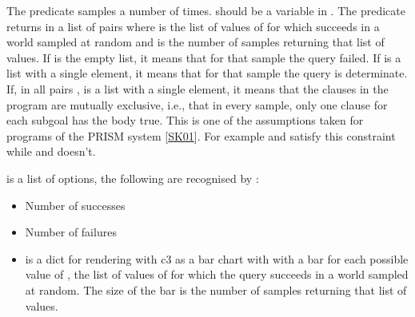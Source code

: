\documentclass[letterpaper,10pt,english]{sphinxmanual}
\begin{document}
\sphinxAtStartPar
The predicate samples  a number of  times.  should be a variable in .
The predicate returns in  a list of pairs  where  is the list of values of  for which  succeeds in a world sampled at random and  is the number of samples returning that list of values. If  is the empty list, it means that for that sample the query failed.
If  is a list with a single element, it means that for that sample the query is determinate.
If, in all pairs ,  is a list with a single element, it means that the clauses in the program are mutually exclusive, i.e., that in every sample, only one clause for each subgoal has the body true.
This is one of the assumptions taken for programs of the PRISM system {[}\hyperlink{cite.index:id55}{SK01}{]}.
For example  and  satisfy this constraint while  and  doesn’t.

\sphinxAtStartPar
{} is a list of options, the following are recognised by :
\begin{itemize}
\item {} 
\sphinxAtStartPar
{} Number of successes

\item {} 
\sphinxAtStartPar
{} Number of failures

\item {} 
\sphinxAtStartPar
{}  is a dict for rendering with c3 as a bar chart with with a bar for each possible value of , the list of values of  for which the query succeeds in a world sampled at random. The size of the bar is the number of samples returning that list of values.

\end{itemize}
\end{document}
